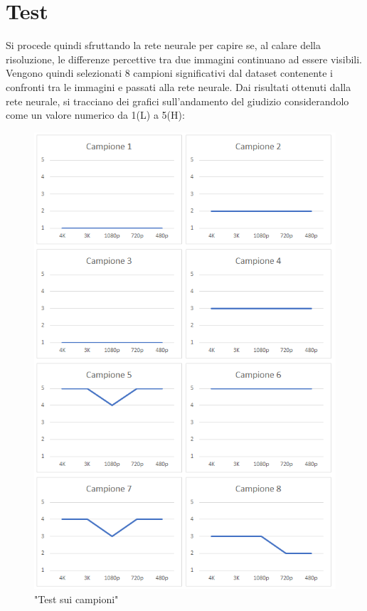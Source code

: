 \documentclass[a4paper,11pt]{article}
\begin{document}
    \section{Test}
    Si procede quindi sfruttando la rete neurale per capire se, al calare della risoluzione, le differenze percettive tra due immagini continuano ad essere visibili.
    Vengono quindi selezionati 8 campioni significativi dal dataset contenente i confronti tra le immagini e passati alla rete neurale. 
    Dai risultati ottenuti dalla rete neurale, si tracciano dei grafici sull'andamento del giudizio considerandolo come un valore numerico da 1(L) a 5(H):
    \begin{figure}[h]
        \centering
        \includegraphics[scale=0.48]{campioni}
        \caption{"Test sui campioni"}
    \end{figure}
\end{document}
